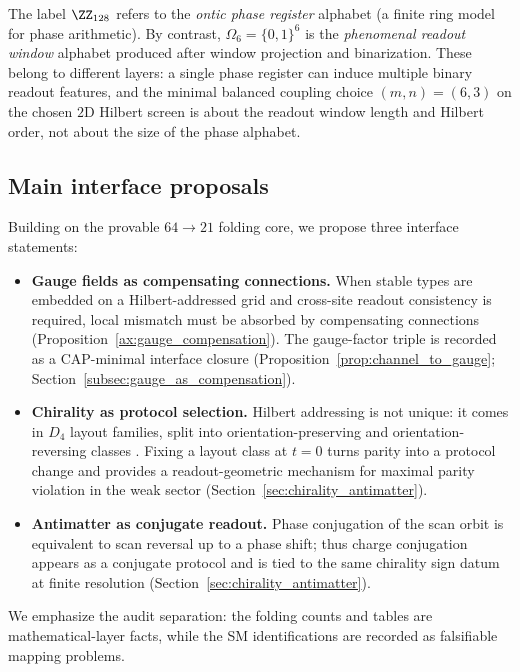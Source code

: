\begin{remark}\label{rem:z128_vs_omega6}
The label $\ZZ_{128}$ refers to the \emph{ontic phase register} alphabet (a finite ring model for phase arithmetic).
By contrast, $\Omega_6=\{0,1\}^6$ is the \emph{phenomenal readout window} alphabet produced after window projection and binarization.
These belong to different layers: a single phase register can induce multiple binary readout features, and the minimal balanced coupling choice $(m,n)=(6,3)$ on the chosen $2$D Hilbert screen is about the readout window length and Hilbert order, not about the size of the phase alphabet.
\end{remark}

\subsection{Main interface proposals}
\label{subsec:intro_contrib}

Building on the provable $64\to 21$ folding core, we propose three interface statements:
\begin{itemize}
\item \textbf{Gauge fields as compensating connections.}
When stable types are embedded on a Hilbert-addressed grid and cross-site readout consistency is required, local mismatch must be absorbed by compensating connections (Proposition~\ref{ax:gauge_compensation}).
The gauge-factor triple is recorded as a CAP-minimal interface closure (Proposition~\ref{prop:channel_to_gauge}; Section~\ref{subsec:gauge_as_compensation}).
\item \textbf{Chirality as protocol selection.}
Hilbert addressing is not unique: it comes in $D_4$ layout families, split into orientation-preserving and orientation-reversing classes \cite{Hilbert1891,Sagan1994}.
Fixing a layout class at $t=0$ turns parity into a protocol change and provides a readout-geometric mechanism for maximal parity violation in the weak sector (Section~\ref{sec:chirality_antimatter}).
\item \textbf{Antimatter as conjugate readout.}
Phase conjugation of the scan orbit is equivalent to scan reversal up to a phase shift; thus charge conjugation appears as a conjugate protocol and is tied to the same chirality sign datum at finite resolution (Section~\ref{sec:chirality_antimatter}).
\end{itemize}

We emphasize the audit separation: the folding counts and tables are mathematical-layer facts, while the SM identifications are recorded as falsifiable mapping problems.
